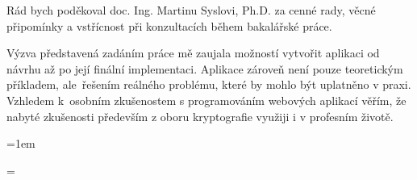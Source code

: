 \documentclass[a4paper,12pt]{article}
\begin{document}
\titulnistrana

\zadani

\prohlaseni

\abstraktaklicovaslova


\clearpage
\thispagestyle{empty}
Rád bych poděkoval doc. Ing. Martinu Syslovi, Ph.D. za cenné rady, věcné připomínky a vstřícnost při konzultacích během bakalářské práce.

\bigskip

\bigskip

\bigskip

Výzva představená zadáním práce mě zaujala možností vytvořit aplikaci od návrhu až po její finální implementaci. Aplikace zároveň není pouze teoretickým příkladem, ale~řešením reálného problému, které by mohlo být uplatněno v praxi. Vzhledem k~osobním zkušenostem s programováním webových aplikací věřím, že nabyté zkušenosti především z oboru kryptografie využiji i v profesním životě.

\obsah  %


\OdsazovaniOdstavcuStart %


\OdsazovaniOdstavcuStop



\emergencystretch=1em
\clearpage

	\begin{thebibliography}{99}
	
	\end{thebibliography}

\emergencystretch=\maxdimen
{}



\seznamobr  %


\seznamtab  %


\seznamkodu



\end{document}
